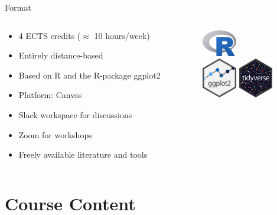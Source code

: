 \begin{frame}[c]{Format}
  \begin{columns}[T,onlytextwidth]
    \begin{column}{0.7\linewidth}
      \begin{itemize}
        \item 4 ECTS credits (\(\approx\) 10 hours/week)
        \item Entirely distance-based
        \item Based on R and the R-package ggplot2
        \item Platform: Canvas
        \item Slack workspace for discussions
        \item Zoom for workshops
        \item Freely available literature and tools
      \end{itemize}
    \end{column}
    \begin{column}{0.3\linewidth}
      \centering
      \includegraphics[width=1.5cm]{figures/r-logo.png}\\
      \vspace{3ex}
      \includegraphics[width=1.5cm]{figures/ggplot2.png}
      \vspace{3ex}
      \includegraphics[width=1.5cm]{figures/tidyverse-logo.png}
    \end{column}
  \end{columns}
\end{frame}

\section{Course Content}


